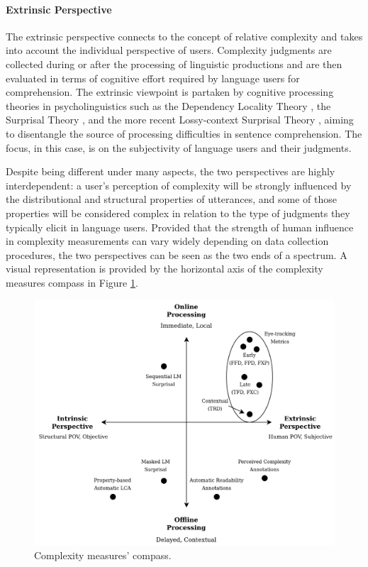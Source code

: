 \documentclass[a4paper, nobind]{templates/ociamthesis}
\begin{document}
\vspace{-12pt}

\paragraph{Extrinsic Perspective} The extrinsic perspective connects to the concept of relative complexity and takes into account the individual perspective of users. Complexity judgments are collected during or after the processing of linguistic productions and are then evaluated in terms of cognitive effort required by language users for comprehension. The extrinsic viewpoint is partaken by cognitive processing theories in psycholinguistics such as the Dependency Locality Theory \autocites{gibson-1998-linguistic}{gibson-2000-dependency}, the Surprisal Theory \autocites{hale-2001-probabilistic}{hale-2016-information}{levy-2008-expectation}, and the more recent Lossy-context Surprisal Theory \autocite{futrell-2020-lossy}, aiming to disentangle the source of processing difficulties in sentence comprehension. The focus, in this case, is on the subjectivity of language users and their judgments.

\vspace{10pt}

Despite being different under many aspects, the two perspectives are highly interdependent: a user's perception of complexity will be strongly influenced by the distributional and structural properties of utterances, and some of those properties will be considered complex in relation to the type of judgments they typically elicit in language users. Provided that the strength of human influence in complexity measurements can vary widely depending on data collection procedures, the two perspectives can be seen as the two ends of a spectrum. A visual representation is provided by the horizontal axis of the complexity measures compass in Figure \ref{fig:compass}.

\begin{figure}
\includegraphics[width=1\linewidth]{figures/1_complexity_compass} \caption{Complexity measures' compass.}\label{fig:compass}
\end{figure}
\end{document}
